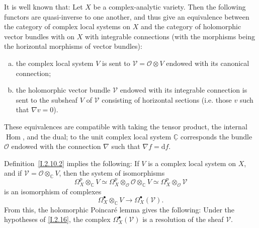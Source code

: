 \documentclass{report}
\theoremstyle{plain}
\newenvironment{proposition}[1]
    {\renewcommand\theinnercustomproposition{#1}\innercustomproposition}
    {\endinnercustomproposition}
\newenvironment{theorem}[1]
    {\renewcommand\theinnercustomtheorem{#1}\innercustomtheorem}
    {\endinnercustomlemma}
\theoremstyle{definition}
\newcommand{\sh}[1]{{\mathscr{#1}}}
\newcommand{\CC}{\mathbb{C}}
\newcommand{\dd}{\mathrm{d}}
\DeclareMathOperator{\Hom}{Hom}
\newcommand{\oldpage}[1]{\marginpar{\footnotesize$\Big\vert$ \textit{p.~#1}}}
\begin{document}
It is well known that:
\begin{theorem}{2.17}
\label{I.2.17}
  Let $X$ be a complex-analytic variety.
  Then the following functors are quasi-inverse to one another, and thus give an equivalence between the category of complex local systems on $X$ and the category of holomorphic vector bundles with on $X$ with integrable connections (with the morphisms being the horizontal morphisms of vector bundles):
  \begin{enumerate}[a)]
    \item the complex local system $V$ is sent to $\sh{V}=\sh{O}\otimes V$ endowed with its canonical connection;
    \item the holomorphic vector bundle $\sh{V}$ endowed with its integrable connection is sent to the subsheaf $V$ of $\sh{V}$ consisting of horizontal sections (i.e. those $v$ such that $\nabla v=0$).
  \end{enumerate}
\end{theorem}

These equivalences are compatible with taking the tensor product, the internal $\Hom$, and the dual;
to the unit complex local system $\underline{\CC}$ corresponds the bundle $\sh{O}$ endowed with the connection $\nabla$ such that $\nabla f=\dd f$.

Definition~\cref{I.2.10.2} implies the following:
\begin{proposition}{2.18}
\label{I.2.18}
  If $V$ is a complex local system on $X$, and if $\sh{V}=\sh{O}\otimes_\CC V$,
\oldpage{13}
  then the system of isomorphisms
  \[
    \Omega_X^p\otimes_\CC V
    \simeq
    \Omega_X^p\otimes_\sh{O}\sh{O}\otimes_\CC V
    \simeq
    \Omega_X^p\otimes_\sh{O}\sh{V}
  \]
  is an isomorphism of complexes
  \[
    \Omega_X^\bullet\otimes_\CC V \to \Omega_X^\bullet(\sh{V}).
  \]
\end{proposition}
From this, the holomorphic Poincar\'{e} lemma gives the following:
\begin{proposition}{2.19}
\label{I.2.19}
  Under the hypotheses of \cref{I.2.16}, the complex $\Omega_X^\bullet(\sh{V})$ is a resolution of the sheaf $\sh{V}$.
\end{proposition}
\end{document}
